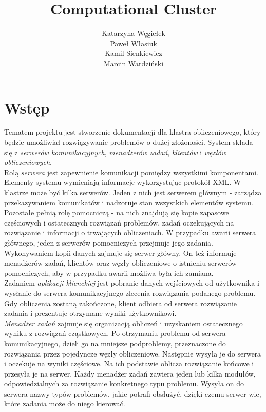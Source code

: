 \documentclass[12pt,a4paper,titlepage]{report}
\author{Katarzyna Węgiełek \\ Paweł Własiuk \\ Kamil Sienkiewicz\\ Marcin Wardziński}
\title{\textbf{Computational Cluster}}
\begin{document}
\maketitle
\tableofcontents

	\chapter{Wstęp}
	Tematem projektu jest stworzenie dokumentacji dla klastra obliczeniowego, który będzie umożliwiał rozwiązywanie problemów o dużej złożoności. System składa się z \textit{serwerów komunikacyjnych}, \textit{menadżerów zadań}, \textit{klientów} i \textit{węzłów obliczeniowych}.\\
Rolą \textit{serwera} jest zapewnienie komunikacji pomiędzy wszystkimi komponentami. Elementy systemu wymieniają informacje wykorzystując protokół XML. W klastrze może być kilka serwerów. Jeden z nich jest serwerem głównym - zarządza przekazywaniem komunikatów i nadzoruje stan wszystkich elementów systemu. Pozostałe pełnią rolę pomocniczą - na nich znajdują się kopie zapasowe częściowych i ostatecznych rozwiązań problemów, zadań oczekujących na rozwiązanie i informacji o trwających obliczeniach. W przypadku awarii serwera głównego, jeden z serwerów pomocniczych przejmuje jego zadania. Wykonywaniem kopii danych zajmuje się serwer główny. On też informuje menadżerów zadań, klientów oraz węzły obliczeniowe o istnieniu serwerów pomocniczych, aby w przypadku awarii możliwa była ich zamiana.\\
Zadaniem \textit{aplikacji klienckiej} jest pobranie danych wejściowych od użytkownika i wysłanie do serwera komunikacyjnego zlecenia rozwiązania podanego problemu. Gdy obliczenia zostaną zakończone, klient odbiera od serwera rozwiązanie zadania i prezentuje otrzymane wyniki użytkownikowi.\\
\textit{Menadżer zadań} zajmuje się organizacją obliczeń i uzyskaniem ostatecznego wyniku z rozwiązań cząstkowych. Po otrzymaniu problemu od serwera komunikacyjnego, dzieli go na mniejsze podproblemy, przeznaczone do rozwiązania przez pojedyncze węzły obliczeniowe. Następnie wysyła je do serwera i oczekuje na wyniki częściowe. Na ich podstawie oblicza rozwiązanie końcowe i przesyła je na serwer. Każdy menadżer zadań zawiera jeden lub kilka modułów, odpowiedzialnych za rozwiązanie konkretnego typu problemu. Wysyła on do serwera nazwy typów problemów, jakie potrafi obsłużyć, dzięki czemu serwer wie, które zadania może do niego kierować.\\
\end{document}
